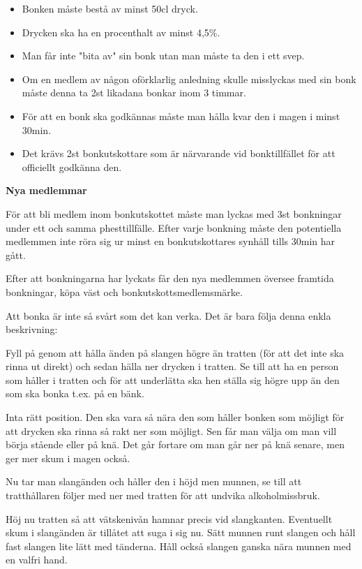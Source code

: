 \begin{itemize}
  \item Bonken måste bestå av minst 50cl dryck.
  \item Drycken ska ha en procenthalt av minst 4,5\%.
  \item Man får inte "bita av" sin bonk utan man måste ta den i ett svep.
  \item Om en medlem av någon oförklarlig anledning skulle misslyckas med sin bonk måste denna ta 2st likadana bonkar inom 3 timmar.
  \item För att en bonk ska godkännas måste man hålla kvar den i magen i minst 30min.
  \item Det krävs 2st bonkutskottare som är närvarande vid bonktillfället för att officiellt godkänna den.
\end{itemize}

\textbf{Nya medlemmar}

För att bli medlem inom bonkutskottet måste man lyckas med 3st bonkningar under ett och samma phesttillfälle. Efter varje bonkning måste den potentiella medlemmen inte röra sig ur minst 
en bonkutskottares synhåll tills 30min har gått. 

Efter att bonkningarna har lyckats får den nya medlemmen översee framtida bonkningar, köpa väst och bonkutskottsmedlemsmärke.\newpage




Att bonka är inte så svårt som det kan verka. Det är bara följa denna enkla beskrivning:

Fyll på genom att hålla änden på slangen högre än tratten (för att det inte ska rinna ut direkt) och sedan hälla ner drycken i tratten. Se till att ha en person som håller i tratten och för att underlätta ska hen ställa sig högre upp än den som ska bonka t.ex. på en bänk.

Inta rätt position. Den ska vara så nära den som håller bonken som möjligt för att drycken ska rinna så rakt ner som möjligt. Sen får man välja om man vill börja stående eller på knä. Det går fortare om man går ner på knä senare, men ger mer skum i magen också.

Nu tar man slangänden och håller den i höjd men munnen, se till att tratthållaren följer med ner med tratten för att undvika alkoholmissbruk.

Höj nu tratten så att vätskenivån hamnar precis vid slangkanten. Eventuellt skum i slangänden är tillåtet att suga i sig nu. Sätt munnen runt slangen och håll fast slangen lite lätt med tänderna. Håll också slangen ganska nära munnen med en valfri hand.

